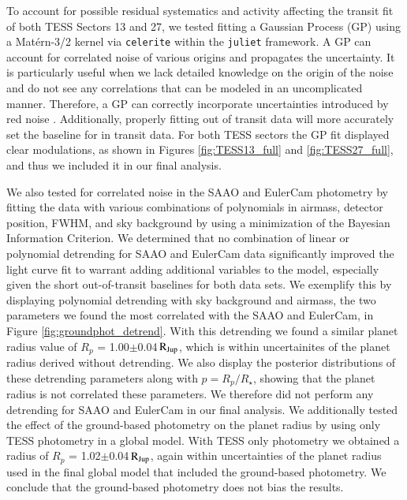 \documentclass{aa}
\newcommand{\rjup}{\mbox{$\mathrm{R_{\rm Jup}}$}\xspace}
\newcommand{\juliet}{{\sc \tt juliet}\xspace}
\begin{document}
To account for possible residual systematics and activity affecting the transit fit of both TESS Sectors 13 and 27, we tested fitting a Gaussian Process (GP) using a Mat\'ern-3/2 kernel via {\sc \tt celerite}\xspace \citep{Foreman-Mackey2017} within the \juliet framework. A GP can account for correlated noise of various origins and propagates the uncertainty. It is particularly useful when we lack detailed knowledge on the origin of the noise and do not see any correlations that can be modeled in an uncomplicated manner. Therefore, a GP can correctly incorporate uncertainties introduced by red noise \citep[e.g.,][]{Gibson2012,Gibson2014}. Additionally, properly fitting out of transit data will more accurately set the baseline for in transit data. For both TESS sectors the GP fit displayed clear modulations, as shown in Figures \ref{fig:TESS13_full} and \ref{fig:TESS27_full}, and thus we included it in our final analysis. 

We also tested for correlated noise in the SAAO and EulerCam photometry by fitting the data with various combinations of polynomials in airmass, detector position, FWHM, and sky background by using a minimization of the Bayesian Information Criterion. We determined that no combination of linear or polynomial detrending for SAAO and EulerCam data significantly improved the light curve fit to warrant adding additional variables to the model, especially given the short out-of-transit baselines for both data sets. We exemplify this by displaying polynomial detrending with sky background and airmass, the two parameters we found the most correlated with the SAAO and EulerCam, in Figure \ref{fig:groundphot_detrend}. With this detrending we found a similar planet radius value of $R_{p}$ = 1.00$\pm$0.04\,\rjup, which is within uncertainites of the planet radius derived without detrending. We also display the posterior distributions of these detrending parameters along with $p=R_p/R_{\star}$, showing that the planet radius is not correlated these parameters. We therefore did not perform any detrending for SAAO and EulerCam in our final analysis. We additionally tested the effect of the ground-based photometry on the planet radius by using only TESS photometry in a global model. With TESS only photometry we obtained a radius of $R_{p}$ = 1.02$\pm$0.04\,\rjup, again within uncertainties of the planet radius used in the final global model that included the ground-based photometry. We conclude that the ground-based photometry does not bias the results.
\end{document}
